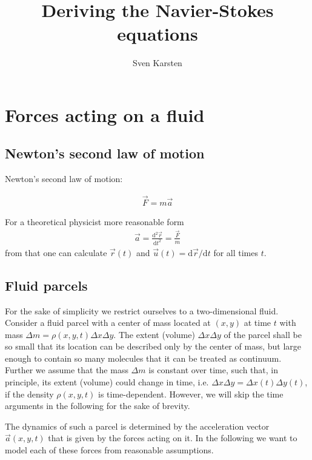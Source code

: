 \documentclass[10pt,a4paper]{article}
\author{Sven Karsten}
\title{Deriving the Navier-Stokes equations}
\renewcommand{\d}{\mathrm{d}}
\begin{document}
\maketitle

\tableofcontents

\section{Forces acting on a fluid}

\subsection{Newton's second law of motion}

Newton's second law of motion:

\begin{align}
\vec{F} = m \vec{a}
\end{align}

For a theoretical physicist more reasonable form 
%
\begin{align}
\vec{a} = \frac{\d^2 \vec{r}}{\d t^2} = \frac{\vec{F}}{m} 
\end{align}
%
from that one can calculate $\vec{r}(t)$ and $\vec{u}(t)={\d \vec{r}}/{\d t}$ for all times $t$.


\subsection{Fluid parcels}

For the sake of simplicity we restrict ourselves to a two-dimensional fluid.
%
Consider a fluid parcel with a center of mass located at $(x,y)$ at time $t$ with mass $\Delta m = \rho(x,y,t) \Delta x \Delta y $.
%
The extent (volume) $\Delta x \Delta y$ of the parcel shall be so small that its location can be described only by the center of mass, but large enough to contain so many molecules that it can be treated as continuum.
%
Further we assume that the mass $\Delta m$ is constant over time, such that, in principle, its extent (volume) could change in time, i.e. $\Delta x \Delta y=\Delta x(t) \Delta y(t)$, if the density $\rho(x,y,t)$ is time-dependent.
%
However, we will skip the time arguments in the following for the sake of brevity. 

The dynamics of such a parcel is determined by the acceleration vector $\vec{a}(x,y,t) $ that is given by the forces acting on it.
%
In the following we want to model each of these forces from reasonable assumptions.
\end{document}
